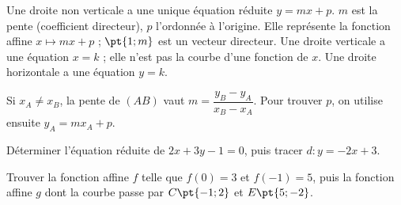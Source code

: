 \begin{keypoint}[Définitions]
Une droite non verticale a une unique équation réduite $y=mx+p$. $m$ est la pente (coefficient directeur), $p$ l'ordonnée à l'origine. Elle représente la fonction affine $x\mapsto mx+p$ ; $\pt{1;m}$ est un vecteur directeur.
Une droite verticale a une équation $x=k$ ; elle n'est pas la courbe d'une fonction de $x$. Une droite horizontale a une équation $y=k$.
\end{keypoint}
\begin{keypoint}
Si $x_A\ne x_B$, la pente de $(AB)$ vaut $m=\dfrac{y_B-y_A}{x_B-x_A}$. Pour trouver $p$, on utilise ensuite $y_A=mx_A+p$.
\end{keypoint}
\begin{example}Déterminer l'équation réduite de $2x+3y-1=0$, puis tracer $d:y=-2x+3$.\end{example}
\begin{center}\end{center}
\begin{example}Trouver la fonction affine $f$ telle que $f(0)=3$ et $f(-1)=5$, puis la fonction affine $g$ dont la courbe passe par $C\pt{-1;2}$ et $E\pt{5;-2}$.\end{example}

